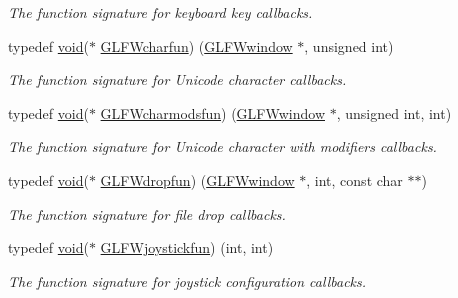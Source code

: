 \begin{DoxyCompactItemize}
\begin{DoxyCompactList}\small\item\em The function signature for keyboard key callbacks. \end{DoxyCompactList}\item 
typedef \mbox{\hyperlink{glad_8h_a950fc91edb4504f62f1c577bf4727c29}{void}}($\ast$ \mbox{\hyperlink{group__input_gabf24451c7ceb1952bc02b17a0d5c3e5f}{G\+L\+F\+Wcharfun}}) (\mbox{\hyperlink{group__window_ga3c96d80d363e67d13a41b5d1821f3242}{G\+L\+F\+Wwindow}} $\ast$, unsigned int)
\begin{DoxyCompactList}\small\item\em The function signature for Unicode character callbacks. \end{DoxyCompactList}\item 
typedef \mbox{\hyperlink{glad_8h_a950fc91edb4504f62f1c577bf4727c29}{void}}($\ast$ \mbox{\hyperlink{group__input_gae36fb6897d2b7df9b128900c8ce9c507}{G\+L\+F\+Wcharmodsfun}}) (\mbox{\hyperlink{group__window_ga3c96d80d363e67d13a41b5d1821f3242}{G\+L\+F\+Wwindow}} $\ast$, unsigned int, int)
\begin{DoxyCompactList}\small\item\em The function signature for Unicode character with modifiers callbacks. \end{DoxyCompactList}\item 
typedef \mbox{\hyperlink{glad_8h_a950fc91edb4504f62f1c577bf4727c29}{void}}($\ast$ \mbox{\hyperlink{group__input_gab71f4ca80b651462852e601caf308c4a}{G\+L\+F\+Wdropfun}}) (\mbox{\hyperlink{group__window_ga3c96d80d363e67d13a41b5d1821f3242}{G\+L\+F\+Wwindow}} $\ast$, int, const char $\ast$$\ast$)
\begin{DoxyCompactList}\small\item\em The function signature for file drop callbacks. \end{DoxyCompactList}\item 
typedef \mbox{\hyperlink{glad_8h_a950fc91edb4504f62f1c577bf4727c29}{void}}($\ast$ \mbox{\hyperlink{group__input_gaa67aa597e974298c748bfe4fb17d406d}{G\+L\+F\+Wjoystickfun}}) (int, int)
\begin{DoxyCompactList}\small\item\em The function signature for joystick configuration callbacks. \end{DoxyCompactList}\end{DoxyCompactItemize}
